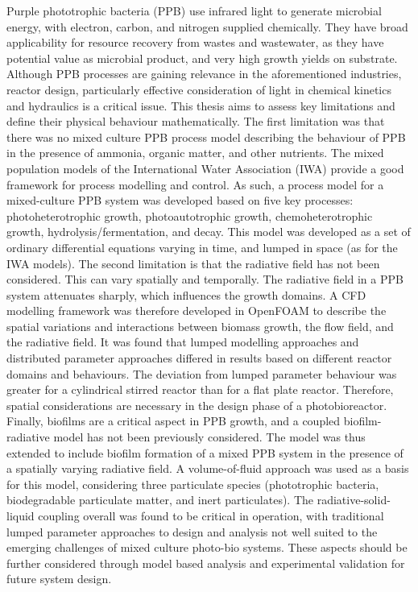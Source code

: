 %
%
%
%
%

Purple phototrophic bacteria (PPB) use infrared light to generate microbial energy, with electron, carbon, and nitrogen supplied chemically. They have broad applicability for resource recovery from wastes and wastewater, as they have potential value as microbial product, and very high growth yields on substrate. Although PPB processes are gaining relevance in the aforementioned industries, reactor design, particularly effective consideration of light in chemical kinetics and hydraulics is a critical issue. This thesis aims to assess key limitations and define their physical behaviour mathematically. The first limitation was that there was no mixed culture PPB process model describing the behaviour of PPB in the presence of ammonia, organic matter, and other nutrients. The mixed population models of the International Water Association (IWA) provide a good framework for process modelling and control. As such, a process model for a mixed-culture PPB system was developed based on five key processes: photoheterotrophic growth, photoautotrophic growth, chemoheterotrophic growth, hydrolysis/fermentation, and decay. This model was developed as a set of ordinary differential equations varying in time, and lumped in space (as for the IWA models). The second limitation is that the radiative field has not been considered. This can vary spatially and temporally. The radiative field in a PPB system attenuates sharply, which influences the growth domains. A CFD modelling framework was therefore developed in OpenFOAM to describe the spatial variations and interactions between biomass growth, the flow field, and the radiative field. It was found that lumped modelling approaches and distributed parameter approaches differed in results based on different reactor domains and behaviours. The deviation from lumped parameter behaviour was greater for a cylindrical stirred reactor than for a flat plate reactor. Therefore, spatial considerations are necessary in the design phase of a photobioreactor. Finally, biofilms are a critical aspect in PPB growth, and a coupled biofilm-radiative model has not been previously considered. The model was thus extended to include biofilm formation of a mixed PPB system in the presence of a spatially varying radiative field. A volume-of-fluid approach was used as a basis for this model, considering three particulate species (phototrophic bacteria, biodegradable particulate matter, and inert particulates). The radiative-solid-liquid coupling overall was found to be critical in operation, with traditional lumped parameter approaches to design and analysis not well suited to the emerging challenges of mixed culture photo-bio systems. These aspects should be further considered through model based analysis and experimental validation for future system design.

%